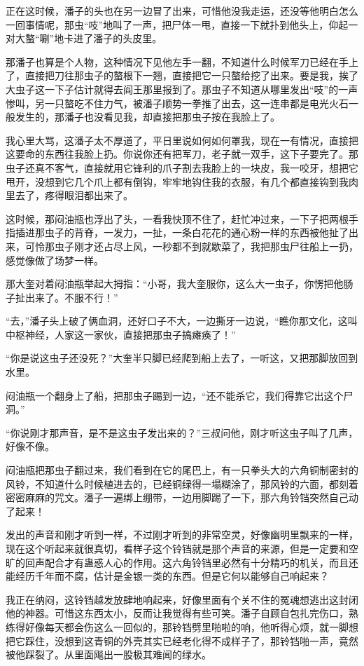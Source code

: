 正在这时候，潘子的头也在另一边冒了出来，可惜他没我走运，还没等他明白怎么一回事情呢，那虫“吱”地叫了一声，把尸体一甩，直接一下就扑到他头上，仰起一对大螯“唰”地卡进了潘子的头皮里。

那潘子也算是个人物，这种情况下见他左手一翻，不知道什么时候军刀已经在手上了，直接把刀往那虫子的螯根下一翘，直接把它一只螯给挖了出来。要是我，挨了大虫子这一下子估计就得去阎王那里报到了。那虫子不知道从哪里发出“吱”的一声惨叫，另一只螯吃不住力气，被潘子顺势一拳推了出去，这一连串都是电光火石一般发生的，那潘子也没看见我，却直接把那虫子按在我脸上了。

我心里大骂，这潘子太不厚道了，平日里说如何如何罩我，现在一有情况，直接把这要命的东西往我脸上扔。你说你还有把军刀，老子就一双手，这下子要完了。那虫子还真不客气，直接就用它锋利的爪子割去我脸上的一块皮，我一咬牙，想把它甩开，没想到它几个爪上都有倒钩，牢牢地钩住我的衣服，有几个都直接钩到我肉里去了，疼得眼泪都出来了。

这时候，那闷油瓶也浮出了头，一看我快顶不住了，赶忙冲过来，一下子把两根手指插进那虫子的背脊，一发力，一扯，一条白花花的通心粉一样的东西被他扯了出来，可怜那虫子刚才还占尽上风，一秒都不到就歇菜了，我把那虫尸往船上一扔，感觉像做了场梦一样。

那大奎对着闷油瓶举起大拇指：“小哥，我大奎服你，这么大一虫子，你愣把他肠子扯出来了。不服不行！”

“去，”潘子头上破了俩血洞，还好口子不大，一边撕牙一边说，“瞧你那文化，这叫中枢神经，人家这一家伙，直接把那虫子搞瘫痪了！”

“你是说这虫子还没死？”大奎半只脚已经爬到船上去了，一听这，又把那脚放回到水里。

闷油瓶一个翻身上了船，把那虫子踢到一边，“还不能杀它，我们得靠它出这个尸洞。”

“你说刚才那声音，是不是这虫子发出来的？”三叔问他，刚才听这虫子叫了几声，好像不像。

闷油瓶把那虫子翻过来，我们看到在它的尾巴上，有一只拳头大的六角铜制密封的风铃，不知道什么时候植进去的，已经铜绿得一塌糊涂了，那风铃的六面，都刻着密密麻麻的咒文。潘子一遍绑上绷带，一边用脚踢了一下，那六角铃铛突然自己动了起来！

发出的声音和刚才听到一样，不过刚才听到的非常空灵，好像幽明里飘来的一样，现在这个听起来就很真切，看样子这个铃铛就是那个声音的来源，但是一定要和空旷的回声配合才有蛊惑人心的作用。这六角铃铛里必然有十分精巧的机关，而且还能经历千年而不腐，估计是金银一类的东西。但是它何以能够自己响起来？

我正在纳闷，这铃铛越发放肆地响起来，好像里面有个关不住的冤魂想逃出这封闭他的神器。可惜这东西太小，反而让我觉得有些可笑。潘子自顾自包扎完伤口，熟练得好像每天都会伤这么一回似的，那铃铛劈里啪啦的响，他听得心烦，就一脚想把它踩住，没想到这青铜的外壳其实已经老化得不成样子了，那铃铛啪一声，竟然被他踩裂了。从里面飚出一股极其难闻的绿水。

